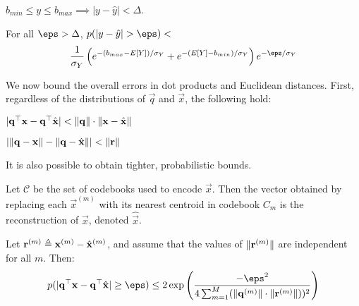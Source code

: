 \begin{lemma}
$b_{min} \le y \le b_{max} \implies |y - \hat{y}| < \Delta$.
\end{lemma}

\begin{lemma}
For all $\eps > \Delta$, \hspace{1mm} $p(|y - \hat{y}| > \eps) <$
\begin{align}
        \frac{1}{\sigma_Y} \left(
            e^{-(b_{max}- E[Y]) / \sigma_Y}
            + e^{-(E[Y] - b_{min}) / \sigma_Y}
        \right)e^{-\eps / \sigma_Y}
\end{align}
\end{lemma}

We now bound the overall errors in dot products and Euclidean distances. First, regardless of the distributions of $\vec{q}$ and $\vec{x}$, the following hold:

\begin{lemma}
$\lvert\mathbf{q}^\top \mathbf{x} - \mathbf{q}^\top \hat{\mathbf{x}}\rvert < \lVert\mathbf{q}\rVert \cdot \lVert\mathbf{x} - \hat{\mathbf{x}}\rVert$
\end{lemma}

\begin{lemma}
$\lvert\lVert\mathbf{q} - \mathbf{x}\rVert - \lVert\mathbf{q} - \hat{\mathbf{x}}\rVert \rvert < \lVert\mathbf{r}\rVert$
\end{lemma}

\noindent It is also possible to obtain tighter, probabilistic bounds.

\begin{definition}[Reconstruction]
Let $\mathcal{C}$ be the set of codebooks used to encode $\vec{x}$. Then the vector obtained by replacing each $\vec{x}^{(m)}$ with its nearest centroid in codebook $C_m$ is the reconstruction of $\vec{x}$, denoted $\hat{\vec{x}}$.
\end{definition}

\begin{lemma}
Let $\mathbf{r}^{(m)} \triangleq \mathbf{x}^{(m)} - \hat{\mathbf{x}}^{(m)}$, and assume that the values of $\lVert \mathbf{r}^{(m)} \rVert$ are independent for all $m$. Then: %
\begin{align} \label{eq:dot_indep}
    p(\abs{\q^\top \x - \q^\top \xhat} \ge \eps) \le 2\exp \left( \frac{-\eps^2}{
        4 \sum_{m=1}^M (\norm{\q^{(m)}} \cdot \norm{ \r^{(m)} }))^2
    }\right)
\end{align}
\end{lemma}


